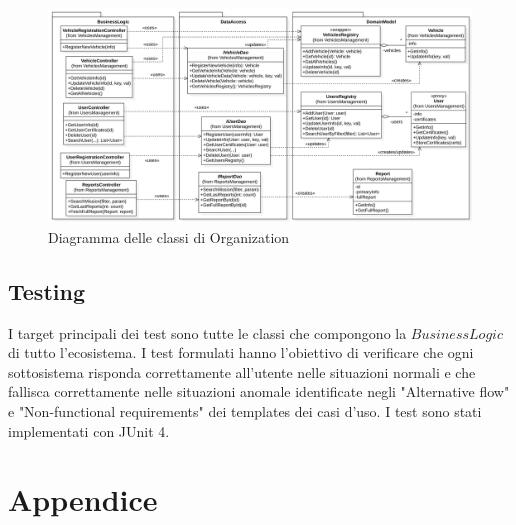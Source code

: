 \documentclass{article}
\begin{document}
    \begin{figure}[!h]
        \centering
        \includegraphics[width=6in]{diagrams/png/uml-organization.png}
        \caption{Diagramma delle classi di Organization}
        \label{fig:uml-organization}
    \end{figure}

    \newpage
    \subsection{Testing}
    I target principali dei test sono tutte le classi che compongono la $BusinessLogic$ di tutto l'ecosistema.
    I test formulati hanno l'obiettivo di verificare che ogni sottosistema risponda correttamente all'utente nelle situazioni normali e che fallisca correttamente nelle situazioni
    anomale identificate negli "Alternative flow" e "Non-functional requirements" dei templates dei casi d'uso.
    I test sono stati implementati con JUnit 4.

    \section{Appendice}
\end{document}
